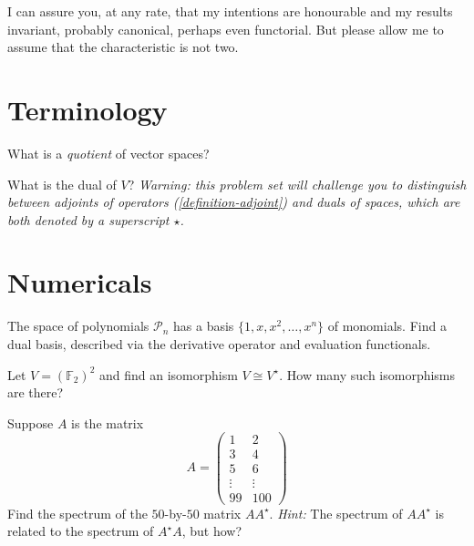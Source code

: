 \documentclass{homework}
\author{Jim Fowler}
\begin{document}
\maketitle

\begin{inspiration}
  I can assure you, at any rate, that my intentions are honourable and
  my results invariant, probably canonical, perhaps even
  functorial. But please allow me to assume that the characteristic is
  not two.
\end{inspiration}

\section{Terminology}

\begin{problem}
  What is a \textit{quotient} of vector spaces?
\end{problem}

\begin{problem}
  What is the dual of $V$?  \textit{Warning: this problem set will
    challenge you to distinguish between adjoints of operators
    (\ref{definition-adjoint}) and duals of spaces, which are both
    denoted by a superscript $\star$.}
\end{problem}

\section{Numericals}

\begin{problem}
  The space of polynomials $\mathcal{P}_n$ has a basis
  $\{1,x,x^2,\ldots,x^n\}$ of monomials.  Find a dual basis, described
  via the derivative operator and evaluation functionals.
\end{problem}

\begin{problem}\label{f2-isomorphism-count}
  Let $V = \left(\mathbb{F}_2\right)^2$ and find an isomorphism
  $V \cong V^\star$.  How many such isomorphisms are there?
\end{problem}

\begin{problem}
  Suppose $A$ is the matrix
  \[
    A = \begin{pmatrix} 1 & 2 \\
      3 & 4 \\
      5 & 6 \\
      \vdots & \vdots \\
      99 & 100
      \end{pmatrix}
    \]
    Find the spectrum of the $50$-by-$50$ matrix $AA^\star$.  \textit{Hint:} The spectrum of $AA^\star$ is related to the spectrum of $A^\star A$, but how?
  \end{problem}
\end{document}
